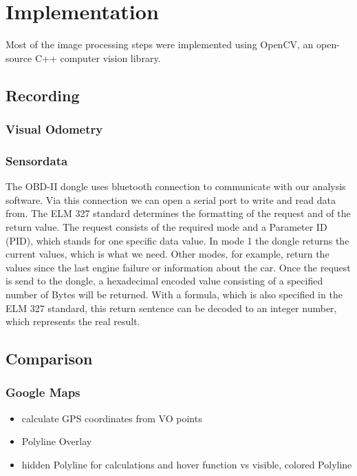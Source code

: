 \section{Implementation}
\label{sec:implementation}

Most of the image processing steps were implemented using OpenCV, an open-source C++ computer vision library. 

\subsection{Recording}
\subsubsection{Visual Odometry}
\subsubsection{Sensordata}
The OBD-II dongle uses bluetooth connection to communicate with our analysis software. Via this connection we can open a serial port to write and read data from.
The ELM 327 standard determines the formatting of the request and of the return value.
The request consists of the required mode and a Parameter ID (PID), which stands for one specific data value. In mode 1 the dongle returns the current values, which is what we need. Other modes, for example, return the values since the last engine failure or information about the car.
Once the request is send to the dongle, a hexadecimal encoded value consisting of a specified number of Bytes will be returned. With a formula, which is also specified in the ELM 327 standard, this return sentence can be decoded to an integer number, which represents the real result.

\subsection{Comparison}
\subsubsection{Google Maps}
\begin{itemize}
	\item calculate GPS coordinates from VO points
	\item Polyline Overlay
	\item hidden Polyline for calculations and hover function vs visible, colored Polyline	
\end{itemize}